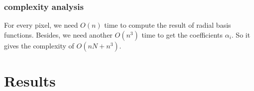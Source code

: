 \documentclass[12pt]{article}
\begin{document}
\subsubsection*{complexity analysis}
For every pixel, we need $O(n)$ time to compute the result of radial basis functions. Besides, we need another $O(n^3)$ time to get the coefficients $\alpha_i$. So it gives the complexity of $O(nN+n^3)$.

\section{Results}
\begin{figure}
\end{figure}
\end{document}
